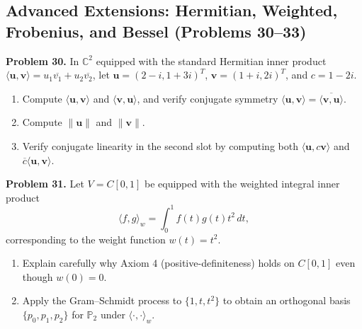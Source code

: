 \documentclass[11pt, letterpaper]{article}
\theoremstyle{definition}
\theoremstyle{remark}
\begin{document}
\subsection{Advanced Extensions: Hermitian, Weighted, Frobenius, and Bessel (Problems 30--33)}

\textbf{Problem 30.} In $\mathbb{C}^2$ equipped with the standard Hermitian inner product $\langle \mathbf{u}, \mathbf{v} \rangle = u_1\overline{v_1} + u_2\overline{v_2}$, let $\mathbf{u} = (2 - i, 1 + 3i)^T$, $\mathbf{v} = (1 + i, 2i)^T$, and $c = 1 - 2i$.
\begin{enumerate}[label=(\alph*)]
    \item Compute $\langle \mathbf{u}, \mathbf{v} \rangle$ and $\langle \mathbf{v}, \mathbf{u} \rangle$, and verify conjugate symmetry $\langle \mathbf{u}, \mathbf{v} \rangle = \overline{\langle \mathbf{v}, \mathbf{u} \rangle}$.
    \item Compute $\|\mathbf{u}\|$ and $\|\mathbf{v}\|$.
    \item Verify conjugate linearity in the second slot by computing both $\langle \mathbf{u}, c\mathbf{v} \rangle$ and $\overline{c}\langle \mathbf{u}, \mathbf{v} \rangle$.
\end{enumerate}

\textbf{Problem 31.} Let $V = C[0, 1]$ be equipped with the weighted integral inner product
\[
\langle f, g \rangle_w = \int_0^1 f(t)g(t)t^2\,dt,
\]
corresponding to the weight function $w(t) = t^2$.
\begin{enumerate}[label=(\alph*)]
    \item Explain carefully why Axiom 4 (positive-definiteness) holds on $C[0, 1]$ even though $w(0) = 0$.
    \item Apply the Gram--Schmidt process to $\{1, t, t^2\}$ to obtain an orthogonal basis $\{p_0, p_1, p_2\}$ for $\mathbb{P}_2$ under $\langle \cdot, \cdot \rangle_w$.
\end{enumerate}
\end{document}
